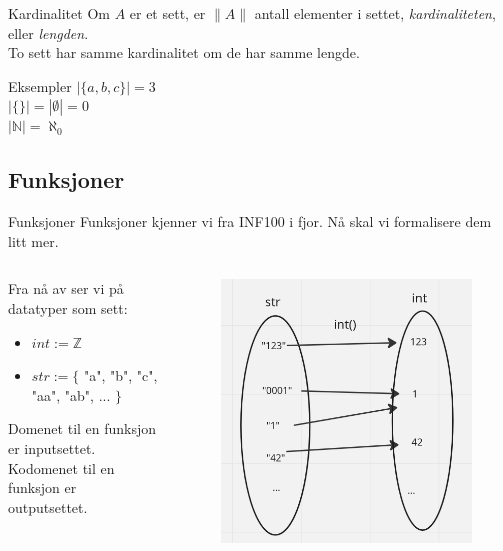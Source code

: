 \begin{frame}{Kardinalitet}
    Om $A$ er et sett, er $\|A\|$ antall elementer i settet, \textit{kardinaliteten}, eller \textit{lengden}.\\
    To sett har samme kardinalitet om de har samme lengde.
    \begin{block}{Eksempler}
        $|\{a, b, c\}| = 3$ \\
        $|\{\}| = |\emptyset| = 0$\\
        $|\mathbb{N}| = \aleph_0$
    \end{block}
\end{frame}

\subsection{Funksjoner}
\begin{frame}{Funksjoner}
    Funksjoner kjenner vi fra INF100 i fjor. Nå skal vi formalisere dem litt mer.\\
    \begin{columns}
        \begin{column}{0.5\textwidth}
            Fra nå av ser vi på datatyper som sett:
            \begin{itemize}
                \item $int := \mathbb{Z}$
                \item $str := \{$ "a", "b", "c", "aa", "ab", ... $\}$
            \end{itemize}
            Domenet til en funksjon er inputsettet.\\
            Kodomenet til en funksjon er outputsettet.
        \end{column}
        \pause
        \begin{column}{0.5\textwidth}
            \begin{figure}
               \includegraphics[scale = 0.4]{images/int.png} 

\end{figure}
\end{column}
\end{columns}
\end{frame}
